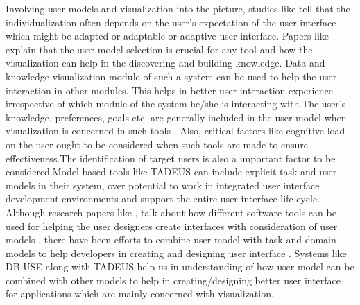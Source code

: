 \documentclass{sig-alternate}
\begin{document}
Involving user models and visualization into the picture, studies like \cite{Schlungbaum:97} tell
that the individualization often depends on the user's expectation of the user
interface which might be adapted or adaptable or adaptive user interface. Papers
like \cite{Ho:01} explain that the user model selection is crucial for any tool and how
the visualization can help in the discovering and building knowledge. Data and
knowledge visualization module of such a system can be used to help the user
interaction in other modules. This helps in better user interaction experience
irrespective of which module of the system he/she is interacting with.The user's
knowledge, preferences, goals etc. are generally included in the user model when
visualization is concerned in such tools \cite{Henderson}. Also, critical factors like cognitive
load on the user ought to be considered when such tools are made to ensure
effectiveness.The identification of target users is also a important factor to be
considered.Model-based tools like TADEUS can include explicit task and user models
in their system, over potential to work in integrated user interface development
environments and support the entire user interface life cycle. Although research
papers like \cite{Schlungbaum:97}, talk about how different software tools can be used for helping
the user designers create interfaces with consideration of user models , there have
been efforts to combine user model with task and domain models to help developers
in creating and designing user interface \cite{Tran:10}. Systems like DB-USE along with TADEUS
help us in understanding of how user model can be combined with other models to help
in creating/designing better user interface for applications which are mainly
concerned with visualization.
\end{document}
